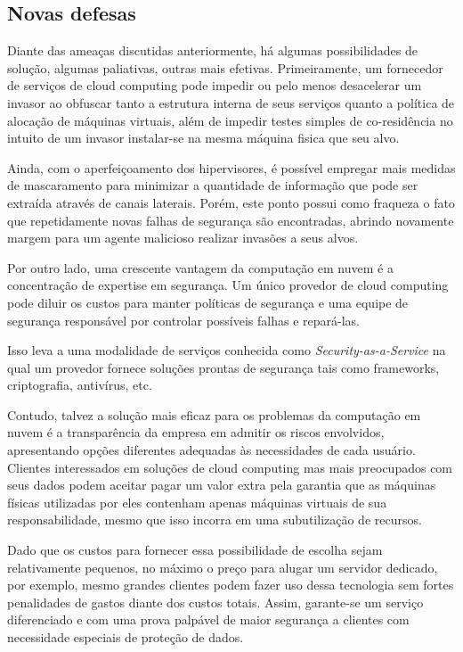 \documentclass[brazil,12pt]{article}
\begin{document}
\subsection{Novas defesas}
Diante das ameaças discutidas anteriormente, há algumas possibilidades de
solução, algumas paliativas, outras mais efetivas. Primeiramente, um fornecedor
de serviços de cloud computing pode impedir ou pelo menos desacelerar um invasor
ao obfuscar tanto a estrutura interna de seus serviços quanto a política de
alocação de máquinas virtuais, além de impedir testes simples de co-residência
no intuito de um invasor instalar-se na mesma máquina fisica que seu alvo.

Ainda, com o aperfeiçoamento dos hipervisores, é possível empregar mais medidas
de mascaramento para minimizar a quantidade de informação que pode ser extraída
através de canais laterais. Porém, este ponto possui como fraqueza o fato que
repetidamente novas falhas de segurança são encontradas, abrindo novamente
margem para um agente malicioso realizar invasões a seus alvos.

Por outro lado, uma crescente vantagem da computação em nuvem é a concentração
de expertise em segurança. Um único provedor de cloud computing pode diluir os
custos para manter políticas de segurança e uma equipe de segurança responsável
por controlar possíveis falhas e repará-las.

Isso leva a uma modalidade de serviços conhecida como
\emph{Security-as-a-Service} na qual um provedor fornece soluções prontas de
segurança tais como frameworks, criptografia, antivírus, etc.

Contudo, talvez a solução mais eficaz para os problemas da computação em nuvem é
a transparência da empresa em admitir os riscos envolvidos, apresentando opções
diferentes adequadas às necessidades de cada usuário. Clientes interessados em
soluções de cloud computing mas mais preocupados com seus dados podem aceitar
pagar um valor extra pela garantia que as máquinas físicas utilizadas por eles
contenham apenas máquinas virtuais de sua responsabilidade, mesmo que isso
incorra em uma subutilização de recursos.

Dado que os custos para fornecer essa possibilidade de escolha sejam
relativamente pequenos, no máximo o preço para alugar um servidor dedicado, por
exemplo, mesmo grandes clientes podem fazer uso dessa tecnologia sem fortes
penalidades de gastos diante dos custos totais. Assim, garante-se um serviço
diferenciado e com uma prova palpável de maior segurança a clientes com
necessidade especiais de proteção de dados.
\end{document}
